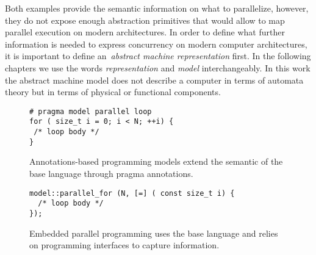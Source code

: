 Both examples provide the semantic information on what to parallelize, however, they do not expose enough abstraction primitives that would allow to map parallel execution on modern architectures. In order to define what further information is needed to express concurrency on modern computer architectures, it is important to define an~\emph{abstract machine representation} first. In the following chapters we use the words \emph{representation} and \emph{model} interchangeably. In this work the abstract machine model does not describe a computer in terms of automata theory but in terms of physical or functional components.

\begin{figure}
\begin{Verbatim}[frame=leftline]
# pragma model parallel loop
for ( size_t i = 0; i < N; ++i) {
 /* loop body */
}
\end{Verbatim}
\caption{Annotations-based programming models extend the semantic of the base language through pragma annotations.}
\label{figOMPLike}
\end{figure}

\begin{figure}
\begin{Verbatim}[frame=leftline]
model::parallel_for (N, [=] ( const size_t i) {
  /* loop body */
});
\end{Verbatim}
\caption{Embedded parallel programming uses the base language and relies on programming interfaces to capture information.}
\label{figKokkosLike}
\end{figure}